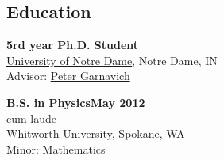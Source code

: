 \documentclass[margin]{res}
\begin{document}
\begin{resume}
\section{Education}

{\bf 5rd year Ph.D. Student}\\%
\href{http://physics.nd.edu}{University of Notre Dame}, Notre Dame, IN \\ 
Advisor: \href{www.nd.edu/~pgarnavi}{Peter Garnavich}


{\bf B.S. in Physics\hfill  May 2012 }\\
cum laude\\%
\href{http://www.whitworth.edu/physics/}{Whitworth University}, Spokane, WA \\ 
Minor: Mathematics
 






\end{resume}
\end{document}
